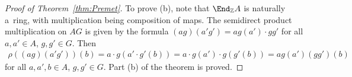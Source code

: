 \begin{proof}[Proof of Theorem~\ref{thm:Premet}]
To prove (b), note that $\End_\mathbb Z A$ is naturally a~ring, with multiplication being composition of maps.
The semidirect product multiplication on $A G$ is given by the formula $(ag)(a'g')=ag(a')\cdot gg'$ for all $a,a'\in A$,
$g,g'\in G$.
Then
\begin{gather*}
\rho((ag)(a'g'))(b)=a\cdot g(a'\cdot g'(b))=a\cdot g(a')\cdot g(g'(b)) = ag(a') (gg')(b)
\end{gather*}
for all $a,a',b\in A$, $g,g'\in G$.
Part (b) of the theorem is proved.
\end{proof}
